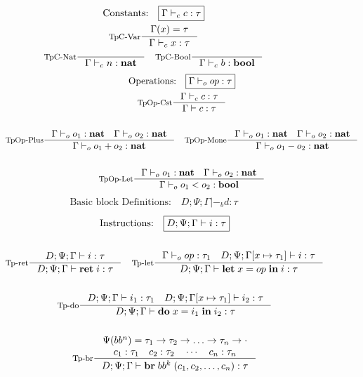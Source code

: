 \documentclass[a4paper, oneside, 10pt, draft]{memoir}
\begin{document}
\newcommand{\tpc}{|-_{c}}
\newcommand{\tpop}{|-_{o}}
\newcommand{\tpb}{|-_{b}}
\begin{figure}
  \begin{gather*}
    \text{Constants:} \quad \boxed{\Gamma \tpc c : \tau}\\
    \inference[TpC-Var]{\Gamma(x) = \tau}{\Gamma \tpc x : \tau}\\
    \inference[TpC-Nat]{}{\Gamma \tpc n : \tnat} \quad
    \inference[TpC-Bool]{}{\Gamma \tpc b : \tbool}
  \end{gather*}
  \begin{gather*}
    \text{Operations:} \quad \boxed{\Gamma \tpop op : \tau} \\
    \inference[TpOp-Cst]{\Gamma \tpc c : \tau}{\Gamma |- c : \tau}\\\\
    \inference[TpOp-Plus]{\Gamma \tpop o_1 : \tnat \quad \Gamma
      \tpop o_2 : \tnat}{\Gamma \tpop o_1 + o_2 : \tnat} \quad
    \inference[TpOp-Mone]{\Gamma \tpop o_1 : \tnat \quad \Gamma
      \tpop o_2 : \tnat}{\Gamma \tpop o_1 - o_2 : \tnat}\\\\
    \inference[TpOp-Let]{\Gamma \tpop o_1 : \tnat \quad \Gamma
      \tpop o_2 : \tnat}{\Gamma \tpop o_1 < o_2 : \tbool}
  \end{gather*}
  \begin{gather*}
    \text{Basic block Definitions:} \quad \boxed{D;\Psi;\Gamma \tpb d
      : \tau}
  \end{gather*}
  \begin{gather*}
    \text{Instructions:} \quad \boxed{D ; \Psi ; \Gamma |- i : \tau}\\\\
    \inference[Tp-ret]{D ; \Psi ; \Gamma |- i : \tau}{D ; \Psi ;
      \Gamma |- \iret{i} : \tau} \quad
    \inference[Tp-let]{\Gamma \tpop op : \tau_1 \quad D ; \Psi ;
      \Gamma[x \mapsto \tau_1] |- i : \tau}{D ; \Psi ; \Gamma |-
      \ilet{x}{op}{i} : \tau}\\\\
    \inference[Tp-do]{D;\Psi;\Gamma |- i_1 : \tau_1 \quad
      D;\Psi;\Gamma[x \mapsto \tau_1] |- i_2 : \tau} {D;\Psi;\Gamma |-
      \ido{x}{i_1}{i_2} : \tau}\\\\
    \inference[Tp-br]{\Psi(bb^n) = \tau_1 -> \tau_2 -> \dotsc ->
      \tau_n -> \cdot\\
      c_1 : \tau_1 \quad c_2 : \tau_2 \quad \dotsb \quad c_n : \tau_n}
    {D;\Psi;\Gamma |- \ibr{bb^k}(c_1, c_2, \dotsc, c_n) : \tau}\\\\

\end{gather*}
\end{figure}
\end{document}

